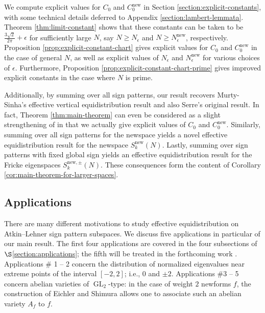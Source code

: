 \documentclass[11pt,letterpaper,reqno]{amsart}
\theoremstyle{definition}
\numberwithin{equation}{section}
\numberwithin{figure}{section}
\numberwithin{table}{section}
\let\subsectiontemp\subsection
\renewcommand{\subsection}[1]{ 
    \subsectiontemp{#1} \hfill\vspace{0.5\linespacing} 
}
\newcommand{\nw}{\mathrm{new}}
\begin{document}
We compute explicit values for $C_0$ and $C_0^\nw$ in Section \ref{section:explicit-constants}, with some technical details deferred to Appendix \ref{section:lambert-lemmata}.  Theorem \ref{thm:limit-constant} shows that these constants can be taken to be $\frac{3\sqrt{2}}{2\pi} +\epsilon$ for sufficiently large $N$, say $N \ge N_\epsilon$ and $N \ge N^\nw_\epsilon$, respectively.
Proposition \ref{prop:explicit-constant-chart} gives explicit values for $C_0$ and $C_0^\nw$ in the case of general $N$, as well as explicit values of $N_\epsilon$ and $N^\nw_\epsilon$ for various choices of $\epsilon$.
Furthermore, Proposition \ref{prop:explicit-constant-chart-prime} gives improved explicit constants in the case where $N$ is prime. 

Additionally, by summing over all sign patterns, our result recovers Murty-Sinha's effective vertical equidistribution result \cite[Theorem 2]{MS07} and also Serre's original result.
In fact, Theorem \ref{thm:main-theorem} can  even be considered as a slight strengthening of \cite[Theorem 2]{MS07} in that we actually give explicit values of $C_0$ and $C_0^\nw$.
Similarly, summing over all sign patterns for the newspace yields a novel effective equidistribution result for the newspace $S_k^\nw(N)$.
Lastly, summing over sign patterns with fixed global sign yields an effective equidistribution result for the Fricke eigenspaces $S_k^{\mathrm{new},\pm}(N)$.
These consequences form the content of Corollary \ref{cor:main-theorem-for-larger-spaces}.



\subsection{Applications}



There are many different motivations to study effective equidistribution on Atkin--Lehner sign pattern subspaces.
We discuss five applications in particular of our main result. The first four applications  are covered in the four subsections of $\S$\ref{section:applications}; the fifth will be treated in the forthcoming work \cite{supersingularity}. Applications \# 1 -- 2 concern the distribution of normalized eigenvalues near extreme points of the interval $[-2, 2]$; i.e., $0$ and $\pm 2.$ Applications \#3 -- 5 concern abelian varieties of $\operatorname{GL}_2$-type: in the case of weight $2$ newforms $f$, the construction of Eichler \cite{Eic54} and Shimura \cite{Shi58} allows one to associate such an abelian variety $A_f$ to $f$.
\end{document}
